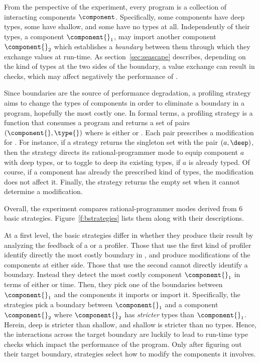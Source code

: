 From the perspective of the experiment, every program \program{} is a
collection of interacting components $\component$. Specifically, some
components have deep types, some  have shallow, and some  have no types at
all. Independently of their types, a component $\component{}_1$, may import
another component $\component{}_2$  which establishes a
\emph{boundary} between them through which they exchange values at
run-time. As section~\ref{sec:seascape} describes, depending on the kind of types at
the two sides of the boundary, a value exchange can result in checks,
which may affect negatively the performance of \program{}. 

 Since boundaries are the source of performance degradation, a profiling
 strategy aims to change the types of components in order to eliminate a
 boundary in a program, hopefully the most costly one. In formal terms, a
 profiling strategy is a function that consumes a program \program{} and
 returns a set of pairs $(\component{}, \type{})$ where \type{} is either
 \deep{} or \shallow{}. Each pair
 prescribes a modification for \program{}. For instance, if a strategy
 returns the singleton set with the pair $(a, \deep)$, then the strategy
 directs its rational-programmer mode to equip component $a$ with deep
 types, or to toggle to deep its existing types, if $a$ is already typed.
 Of course, if a component has already the prescribed kind of types, the
 modification does not affect it. Finally, the strategy returns the empty
 set when it cannot determine a modification.

 Overall, the experiment compares rational-programmer modes
 derived from 6 basic strategies. Figure~\ref{f:bstrategies}
 lists them along with their descriptions.

 At a first level, the basic strategies differ in whether they produce their
 result by analyzing the feedback of a \featkw{} or a \statkw{} profiler.
 Those that use the first kind of profiler identify directly the most
 costly boundary in \program{}, and produce modifications of the
 components at either side.  Those that use the second cannot directly
 identify a boundary.  Instead they detect the most costly component
 $\component{}_1$ in terms of either \selfkw{} or \totalkw{} time.  Then,
 they pick  one of the boundaries between $\component{}_1$ and the components it
 imports or import it.  Specifically, the strategies pick a boundary
 between $\component{}_1$ and a component $\component{}_2$ where
 $\component{}_2$
 has \emph{stricter} types than $\component{}_1$. Herein, deep is stricter
 than shallow, and shallow is stricter than no types.  Hence, the
 interactions across the target boundary are luckily to lead to run-time
 type checks which impact the performance of the program.  Only after
 figuring out their target boundary, \statkw{} strategies select how to
 modify the components it involves.

